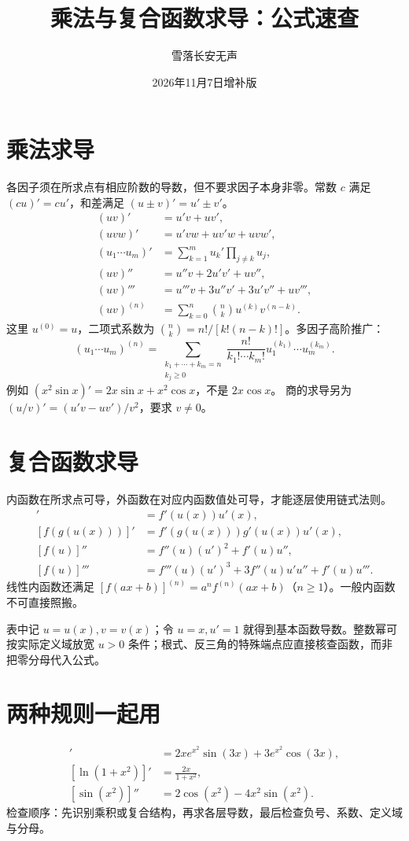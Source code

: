 \documentclass[UTF8,11pt,fontset=fandol]{ctexart}
\title{乘法与复合函数求导：公式速查}
\author{雪落长安无声}
\date{2026年11月7日增补版}
\begin{document}
\pagestyle{plain}
\maketitle
\section{乘法求导}
各因子须在所求点有相应阶数的导数，但不要求因子本身非零。常数 $c$ 满足 $(cu)'=cu'$，和差满足 $(u\pm v)'=u'\pm v'$。
\begin{align*}
 (uv)'&=u'v+uv',\\
 (uvw)'&=u'vw+uv'w+uvw',\\
 (u_1\cdots u_m)'&=\sum_{k=1}^{m}u_k'\prod_{j\ne k}u_j,\\
 (uv)''&=u''v+2u'v'+uv'',\\
 (uv)'''&=u'''v+3u''v'+3u'v''+uv''',\\
 (uv)^{(n)}&=\sum_{k=0}^{n}\binom nk u^{(k)}v^{(n-k)}.
\end{align*}
这里 $u^{(0)}=u$，二项式系数为 $\binom nk=n!/[k!(n-k)!]$。多因子高阶推广：
\[
 (u_1\cdots u_m)^{(n)}=
 \sum_{\substack{k_1+\cdots+k_m=n\\k_j\ge0}}
 \frac{n!}{k_1!\cdots k_m!}u_1^{(k_1)}\cdots u_m^{(k_m)}.
\]
例如 $(x^2\sin x)'=2x\sin x+x^2\cos x$，不是 $2x\cos x$。
商的求导另为 $(u/v)'=(u'v-uv')/v^2$，要求 $v\ne0$。

\section{复合函数求导}
内函数在所求点可导，外函数在对应内函数值处可导，才能逐层使用链式法则。
\begin{align*}
 [f(u(x))]'&=f'(u(x))u'(x),\\
 [f(g(u(x)))]'&=f'(g(u(x)))g'(u(x))u'(x),\\
 [f(u)]''&=f''(u)(u')^2+f'(u)u'',\\
 [f(u)]'''&=f'''(u)(u')^3+3f''(u)u'u''+f'(u)u'''.
\end{align*}
线性内函数还满足 $[f(ax+b)]^{(n)}=a^nf^{(n)}(ax+b)$（$n\ge1$）。一般内函数不可直接照搬。

表中记 $u=u(x),v=v(x)$；令 $u=x,u'=1$ 就得到基本函数导数。整数幂可按实际定义域放宽 $u>0$ 条件；根式、反三角的特殊端点应直接核查函数，而非把零分母代入公式。

\section{两种规则一起用}
\begin{align*}
 [e^{x^2}\sin(3x)]'&=2xe^{x^2}\sin(3x)+3e^{x^2}\cos(3x),\\
 [\ln(1+x^2)]'&=\frac{2x}{1+x^2},\\
 [\sin(x^2)]''&=2\cos(x^2)-4x^2\sin(x^2).
\end{align*}
检查顺序：先识别乘积或复合结构，再求各层导数，最后检查负号、系数、定义域与分母。
\end{document}
